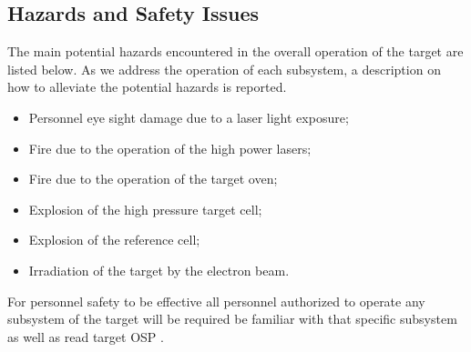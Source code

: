 \begin{safetyen}{10}{5}
\section{Hazards and Safety Issues}
\label{sec:haz}

The main potential hazards encountered in the overall operation of the
target are listed below.
As we address the operation of each subsystem, a description on how to
alleviate the potential
hazards is reported. 

\begin{itemize}
  \item Personnel eye sight damage due to a laser light exposure;
  \item Fire due to the operation of the high power lasers;
  \item Fire due to the operation of the target oven;
  \item Explosion of the high pressure target cell;
  \item Explosion of the reference cell;
  \item Irradiation of the target by the electron beam.
\end{itemize}

For personnel safety to be effective all personnel authorized to operate
any subsystem of the target will be required  be familiar with that 
specific subsystem as well as read 
  target OSP%
.

\end{safetyen}

